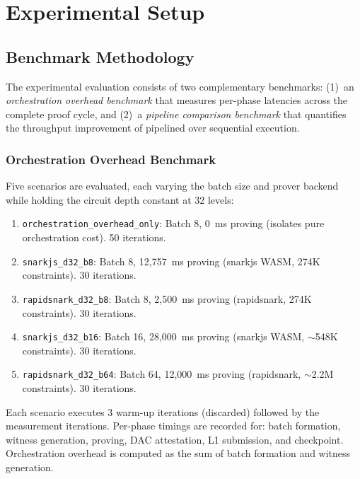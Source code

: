 
\section{Experimental Setup}

\subsection{Benchmark Methodology}

The experimental evaluation consists of two complementary benchmarks:
(1)~an \emph{orchestration overhead benchmark} that measures per-phase
latencies across the complete proof cycle, and (2)~a \emph{pipeline
comparison benchmark} that quantifies the throughput improvement of
pipelined over sequential execution.

\subsubsection{Orchestration Overhead Benchmark}

Five scenarios are evaluated, each varying the batch size and prover
backend while holding the circuit depth constant at 32 levels:

\begin{enumerate}
\item \texttt{orchestration\_overhead\_only}: Batch 8, 0~ms proving
  (isolates pure orchestration cost). 50 iterations.
\item \texttt{snarkjs\_d32\_b8}: Batch 8, 12,757~ms proving (snarkjs
  WASM, 274K constraints). 30 iterations.
\item \texttt{rapidsnark\_d32\_b8}: Batch 8, 2,500~ms proving
  (rapidsnark, 274K constraints). 30 iterations.
\item \texttt{snarkjs\_d32\_b16}: Batch 16, 28,000~ms proving (snarkjs
  WASM, $\sim$548K constraints). 30 iterations.
\item \texttt{rapidsnark\_d32\_b64}: Batch 64, 12,000~ms proving
  (rapidsnark, $\sim$2.2M constraints). 30 iterations.
\end{enumerate}

Each scenario executes 3 warm-up iterations (discarded) followed by the
measurement iterations. Per-phase timings are recorded for: batch
formation, witness generation, proving, DAC attestation, L1 submission,
and checkpoint. Orchestration overhead is computed as the sum of batch
formation and witness generation.

